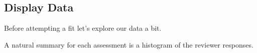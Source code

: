 \documentclass[
  letterpaper,
  DIV=11,
  numbers=noendperiod]{scrartcl}
\newenvironment{Shaded}{\begin{snugshade}}{\end{snugshade}}
\newcommand{\DecValTok}[1]{\textcolor[rgb]{0.68,0.00,0.00}{#1}}
\newcommand{\FunctionTok}[1]{\textcolor[rgb]{0.28,0.35,0.67}{#1}}
\newcommand{\NormalTok}[1]{\textcolor[rgb]{0.00,0.23,0.31}{#1}}
\newcommand{\OtherTok}[1]{\textcolor[rgb]{0.00,0.23,0.31}{#1}}
\newcommand{\SpecialCharTok}[1]{\textcolor[rgb]{0.37,0.37,0.37}{#1}}
\newcommand{\StringTok}[1]{\textcolor[rgb]{0.13,0.47,0.30}{#1}}
\begin{document}
\begin{Shaded}
\end{Shaded}

\hypertarget{display-data}{%
\subsection{Display Data}\label{display-data}}

Before attempting a fit let's explore our data a bit.

A natural summary for each assessment is a histogram of the reviewer
responses.
\end{document}
